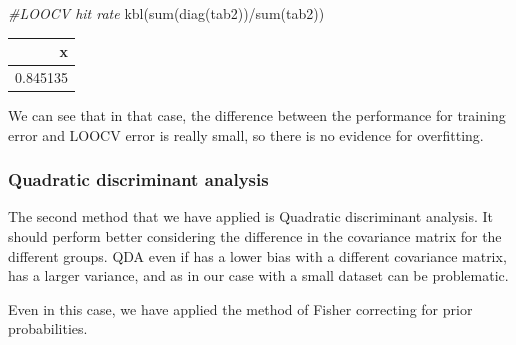 \documentclass[
  11pt,
]{article}
\newenvironment{Shaded}{\begin{snugshade}}{\end{snugshade}}
\newcommand{\AttributeTok}[1]{\textcolor[rgb]{0.77,0.63,0.00}{#1}}
\newcommand{\CommentTok}[1]{\textcolor[rgb]{0.56,0.35,0.01}{\textit{#1}}}
\newcommand{\DecValTok}[1]{\textcolor[rgb]{0.00,0.00,0.81}{#1}}
\newcommand{\FunctionTok}[1]{\textcolor[rgb]{0.00,0.00,0.00}{#1}}
\newcommand{\NormalTok}[1]{#1}
\newcommand{\OtherTok}[1]{\textcolor[rgb]{0.56,0.35,0.01}{#1}}
\newcommand{\SpecialCharTok}[1]{\textcolor[rgb]{0.00,0.00,0.00}{#1}}
\begin{document}
\begin{Shaded}
\begin{Highlighting}[]
\CommentTok{\#LOOCV hit rate}
\FunctionTok{kbl}\NormalTok{(}\FunctionTok{sum}\NormalTok{(}\FunctionTok{diag}\NormalTok{(tab2))}\SpecialCharTok{/}\FunctionTok{sum}\NormalTok{(tab2))}
\end{Highlighting}
\end{Shaded}

\begin{tabular}[t]{r}
\hline
x\\
\hline
0.845135\\
\hline
\end{tabular}

We can see that in that case, the difference between the performance for training error and LOOCV error is really small, so there is no evidence for overfitting.

\hypertarget{quadratic-discriminant-analysis}{%
\subsubsection{Quadratic discriminant analysis}\label{quadratic-discriminant-analysis}}

The second method that we have applied is Quadratic discriminant analysis. It should perform better considering the difference in the covariance matrix for the different groups. QDA even if has a lower bias with a different covariance matrix, has a larger variance, and as in our case with a small dataset can be problematic.

Even in this case, we have applied the method of Fisher correcting for prior probabilities.

\begin{Shaded}
\end{Shaded}
\end{document}
